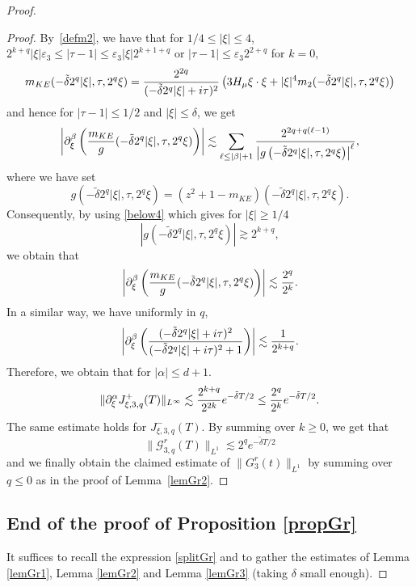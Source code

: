\documentclass[11pt]{amsart}
\numberwithin{equation}{section}
\newcommand{\eps}{\varepsilon}
\begin{document}
\begin{proof}
\begin{proof}
   By~\eqref{defm2}, we  have that  for $1/4 \leq | \xi | \leq 4$, 
   $2^{k+q}  |\xi| \eps_{3} \leq  |\tau - 1 | \leq \eps_{3}  |\xi| 2^{k + 1+q}$ or  $ |\tau - 1 | \leq \eps_{3} 2^{2+q}$ for $k=0$,
   $$  m_{KE} (
    - \tilde \delta 2^q | \xi |,  \tau,  
    2^q  \xi )= { 2^{2q} \over   (- \tilde \delta 2^q| \xi| + i \tau)^2} \left( 3 H_\mu \xi \cdot \xi  + | \xi| ^4 m_{2} (
    - \tilde \delta 2^q | \xi |,  \tau,  
    2^q  \xi ) \right)$$
    and hence for $|\tau - 1 |\leq 1/2$ and $|\xi|\leq \delta$, we get 
        $$ \left|\partial_{\xi}^\beta \left(   {m_{KE} \over g} (
    - \tilde \delta 2^q | \xi |,  \tau,  
    2^q  \xi ) \right)\right| \lesssim  \sum_{\ell \leq | \beta | + 1 }   { 2^{2q +q(\ell-1)} \over \left|g   \left(
    - \tilde \delta 2^q | \xi |,  \tau,  
    2^q  \xi  \right)\right|^\ell},
   $$
    where we have set
    $$ g  (
    - \tilde \delta 2^q | \xi |,  \tau,  
    2^q  \xi )= (z^2+ 1 -m_{KE}) (
    - \tilde \delta 2^q | \xi |,  \tau,  
    2^q  \xi ).$$
  Consequently, by using  \eqref{below4} which gives for $|\xi |\geq 1/4$ %
 $$  | g(- \tilde \delta 2^q | \xi |,  \tau,  
    2^q  \xi ) | \gtrsim  2^{k+ q}, $$
   we obtain that
  $$  \left|\partial_{\xi}^\beta \left(   {m_{KE} \over g} (
    - \tilde \delta 2^q | \xi |,  \tau,  
    2^q  \xi ) \right)\right| \lesssim { 2^q \over 2^k}.$$
     In a similar way, we have uniformly in $q$,
  $$\left | \partial_{\xi}^\beta \left(   {(-  \tilde \delta  2^q| \xi| + i\tau)^2 \over  (-  \tilde \delta  2^q| \xi| + i\tau)^2 + 1 } \right)
   \right| \lesssim { 1 \over 2^{k+q}}.$$
   Therefore, we obtain that for $| \alpha | \leq d+1.$
 $$    \|\partial^\alpha_{\xi} J_{\xi, 3, q}^+(T)\|_{L^\infty} \lesssim  {2^{k+q} \over  2^{2k}}  e^{-  \tilde \delta T/2}
  \leq { 2^q \over 2^k}  e^{-  \tilde \delta T/2}.
  $$
  The same estimate holds for $J_{\xi, 3, q}^-(T)$. By summing over $k \geq 0$, we get that
  $$ \| \mathcal{G}_{3, q}^r  (T ) \|_{L^1} \lesssim  2^q e^{ -\tilde \delta  T/2}$$
  and we finally obtain the claimed estimate of $ \| G^r_{3} (t)  \|_{L^1}$ by summing over $q \leq 0$ as in the proof of Lemma~\ref{lemGr2}.
  
   \end{proof}
 \subsection*{End of the proof of Proposition \ref{propGr}}
 It suffices to recall the expression \eqref{splitGr} and to gather the estimates of Lemma \ref{lemGr1}, Lemma \ref{lemGr2}
  and Lemma \ref{lemGr3} (taking $\delta$ small enough).
 \end{proof}
 
\end{document}
